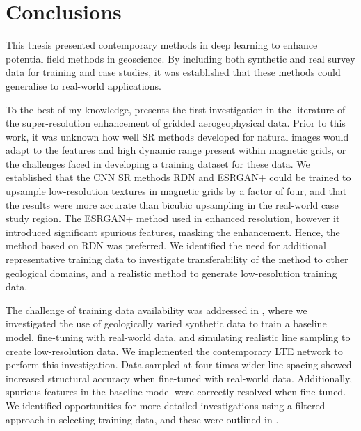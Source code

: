 \printbibliography{}

\chapter{Conclusions}
\label{ch:conclusions}
This thesis presented contemporary methods in deep learning to enhance potential field methods in geoscience.
By including both synthetic and real survey data for training and case studies, it was established that these methods could generalise to real-world applications.

To the best of my knowledge,  presents the first investigation in the literature of the super-resolution enhancement of gridded aerogeophysical data.
Prior to this work, it was unknown how well SR methods developed for natural images would adapt to the features and high dynamic range present within magnetic grids, or the challenges faced in developing a training dataset for these data.
We established that the CNN SR methods RDN\textdaggerdbl{} and ESRGAN+ could be trained to upsample low-resolution textures in magnetic grids by a factor of four, and that the results were more accurate than bicubic upsampling in the real-world case study region.
The ESRGAN+ method used in  enhanced resolution, however it introduced significant spurious features, masking the enhancement.
Hence, the method based on RDN\textdaggerdbl{} was preferred.
We identified the need for additional representative training data to investigate transferability of the method to other geological domains, and a realistic method to generate low-resolution training data.

The challenge of training data availability was addressed in , where we investigated the use of geologically varied synthetic data to train a baseline model, fine-tuning with real-world data, and simulating realistic line sampling to create low-resolution data.
We implemented the contemporary LTE network to perform this investigation.
Data sampled at four times wider line spacing showed increased structural accuracy when fine-tuned with real-world data.
Additionally, spurious features in the baseline model were correctly resolved when fine-tuned.
We identified opportunities for more detailed investigations using a filtered approach in selecting training data, and these were outlined in .

